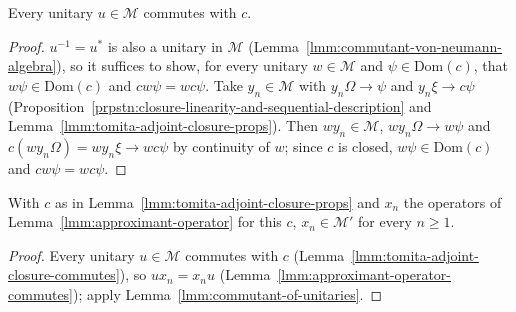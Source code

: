 \begin{lemma}
    \label{lmm:tomita-adjoint-closure-commutes}
    \leanok
    Every unitary $u \in \mathcal{M}$ commutes with $c$.
\end{lemma}
\begin{proof}
    \leanok
    $u^{-1} = u^*$ is also a unitary in $\mathcal{M}$ (Lemma~\ref{lmm:commutant-von-neumann-algebra}), so it suffices to show, for every unitary $w \in \mathcal{M}$ and $\psi \in \text{Dom}(c)$, that $w\psi \in \text{Dom}(c)$ and $cw\psi = wc\psi$. Take $y_n \in \mathcal{M}$ with $y_n\Omega \to \psi$ and $y_n\xi \to c\psi$ (Proposition~\ref{prpstn:closure-linearity-and-sequential-description} and Lemma~\ref{lmm:tomita-adjoint-closure-props}). Then $wy_n \in \mathcal{M}$, $wy_n\Omega \to w\psi$ and $c(wy_n\Omega) = wy_n\xi \to wc\psi$ by continuity of $w$; since $c$ is closed, $w\psi \in \text{Dom}(c)$ and $cw\psi = wc\psi$.
\end{proof}

\begin{lemma}
    \label{lmm:tomita-adjoint-approximants-commutant}
    \leanok
    With $c$ as in Lemma~\ref{lmm:tomita-adjoint-closure-props} and $x_n$ the operators of Lemma~\ref{lmm:approximant-operator} for this $c$, $x_n \in \mathcal{M}'$ for every $n \ge 1$.
\end{lemma}
\begin{proof}
    \leanok
    Every unitary $u \in \mathcal{M}$ commutes with $c$ (Lemma~\ref{lmm:tomita-adjoint-closure-commutes}), so $ux_n = x_nu$ (Lemma~\ref{lmm:approximant-operator-commutes}); apply Lemma~\ref{lmm:commutant-of-unitaries}.
\end{proof}

